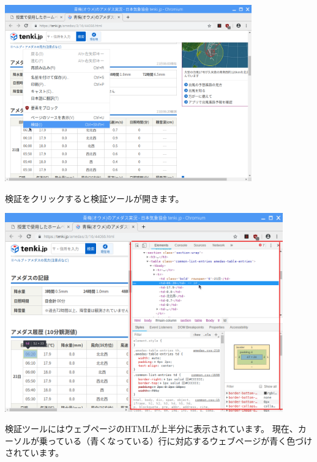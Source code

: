 \begin{center}
\includegraphics[width=0.8\textwidth]{./text08-img/textbook-img034.png}

\end{center}
\clearpage
検証をクリックすると検証ツールが開きます。



\begin{center}
\includegraphics[width=0.9\textwidth]{./text08-img/textbook-img035.png}

\end{center}
検証ツールにはウェブページのHTMLが上半分に表示されています。
現在、カーソルが乗っている（青くなっている）行に対応するウェブページが青く色づけされています。



